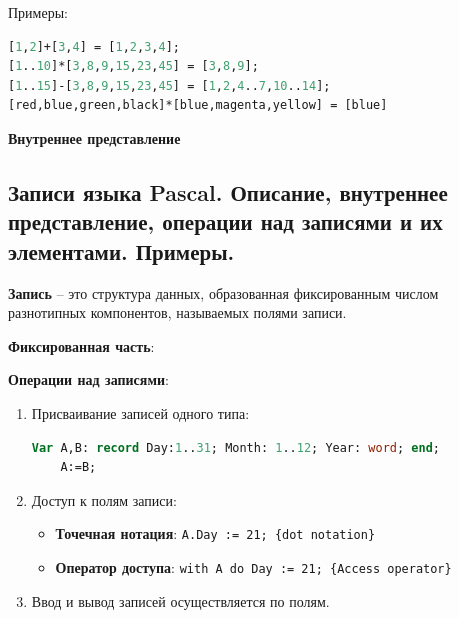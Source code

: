 \noindent
Примеры:
\begin{lstlisting}[language=Pascal]
[1,2]+[3,4] = [1,2,3,4];
[1..10]*[3,8,9,15,23,45] = [3,8,9];
[1..15]-[3,8,9,15,23,45] = [1,2,4..7,10..14];
[red,blue,green,black]*[blue,magenta,yellow] = [blue]
\end{lstlisting}

\noindent
{\bf{Внутреннее представление}}







\newpage\subsection{Записи языка Pascal. Описание, внутреннее представление, операции над записями и их 
элементами. Примеры. }

\begin{myquote}
            
\end{myquote}

{\bf{Запись}} – это структура данных, образованная фиксированным числом разнотипных компонентов, называемых полями записи.


\noindent
{\bf{Фиксированная часть}}:


\noindent
{\bf{Операции над записями}}:

\begin{enumerate}
\item Присваивание записей одного типа:

\begin{lstlisting}[language=Pascal]
	Var A,B: record Day:1..31; Month: 1..12; Year: word; end;
	A:=B;
\end{lstlisting}

\item Доступ к полям записи:
\begin{itemize}

\item {\bf{Точечная нотация}}: \texttt{A.Day := 21; \{dot notation\}}


\item {\bf{Оператор доступа}}: \texttt{with A do Day := 21; \{Access operator\}}


\end{itemize}

\item Ввод и вывод записей осуществляется по полям.

\end{enumerate}
    

